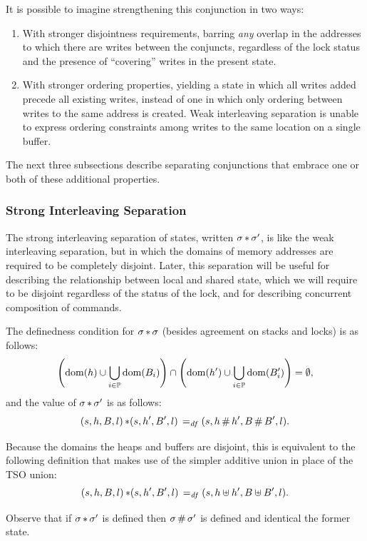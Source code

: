 \documentclass[11pt]{article}
\begin{document}
It is possible to imagine strengthening this conjunction in two ways: \begin{enumerate}
	\item With stronger disjointness requirements, barring \emph{any} overlap in the addresses to which there are writes between the conjuncts, regardless of the lock status and the presence of ``covering'' writes in the present state.  
	
	\item With stronger ordering properties, yielding a state in which all writes added precede all existing writes, instead of one in which only ordering between writes to the same address is created. Weak interleaving separation is unable to express ordering constraints among writes to the same location on a single buffer. 
\end{enumerate}

The next three subsections describe separating conjunctions that embrace one or both of these additional properties. 

\subsubsection{Strong Interleaving Separation}

The strong interleaving separation of states, written $\sigma \operatorname{\ast} \sigma'$, is like the weak interleaving separation, but in which the domains of memory addresses are required to be completely disjoint. Later, this separation will be useful for describing the relationship between local and shared state, which we will require to be disjoint regardless of the status of the lock, and for describing concurrent composition of commands.

 The definedness condition for $\sigma \operatorname{\ast} \sigma$ (besides agreement on stacks and locks) is as follows: \[ \left(\operatorname{\mathrm{dom}}(h) \cup \bigcup_{i \in \mathbb{P}} \operatorname{\mathrm{dom}}(B_i) \right) \cap \left( \operatorname{\mathrm{dom}}(h') \cup \bigcup_{i \in \mathbb{P}} \operatorname{\mathrm{dom}}(B'_i)\right) = \operatorname{\emptyset}, \] and the value of $\sigma \operatorname{\ast} \sigma'$ is as follows: \[ (s,h,B,l) \operatorname{\ast} (s,h',B',l) \operatorname{\;=_{\mathit{df}}\;} (s,h\operatorname{\#} h',B\operatorname{\#} B',l).\] 

Because the domains the heaps and buffers are disjoint, this is equivalent to the following definition that makes use of the simpler additive union in place of the TSO union: \[ (s,h,B,l) \operatorname{\ast} (s,h',B',l) \operatorname{\;=_{\mathit{df}}\;} (s,h\uplus h',B\uplus B',l).\] 

Observe that if $\sigma \operatorname{\ast} \sigma'$ is defined then $\sigma \operatorname{\#} \sigma'$ is defined and identical the former state. 
\end{document}
